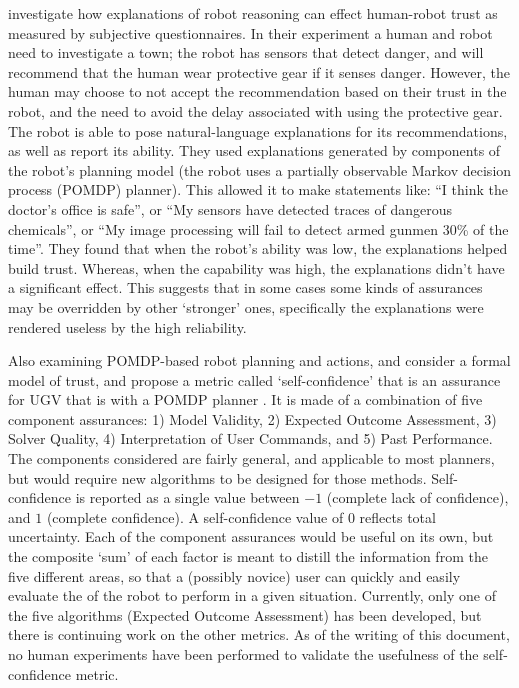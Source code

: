   \citet{Wang2016-id} investigate how explanations of robot reasoning can effect human-robot trust as measured by subjective questionnaires. In their experiment a human and robot need to investigate a town; the robot has sensors that detect danger, and will recommend that the human wear protective gear if it senses danger. However, the human may choose to not accept the recommendation based on their trust in the robot, and the need to avoid the delay associated with using the protective gear. The robot is able to pose natural-language explanations for its recommendations, as well as report its ability. They used explanations generated by components of the robot's planning model (the robot uses a partially observable Markov decision process (POMDP) planner). This allowed it to make statements like: ``I think the doctor's office is safe'', or ``My sensors have detected traces of dangerous chemicals'', or ``My image processing will fail to detect armed gunmen 30\% of the time''. They found that when the robot's ability was low, the explanations helped build trust. Whereas, when the capability was high, the explanations didn't have a significant effect. This suggests that in some cases some kinds of assurances may be overridden by other `stronger' ones, specifically the explanations were rendered useless by the high reliability. 

Also examining POMDP-based robot planning and actions, \citet{Aitken2016-fb} and \citet{Aitken2016-cv} consider a formal model of trust, and propose a metric called `self-confidence' that is an assurance for UGV that is with a  POMDP planner . It is made of a combination of five component assurances: 1) Model Validity, 2) Expected Outcome Assessment, 3) Solver Quality, 4) Interpretation of User Commands, and 5) Past Performance. The components considered are fairly general, and applicable to most planners, but would require new algorithms to be designed for those methods.   
Self-confidence is reported as a single value between $-1$ (complete lack of confidence), and $1$ (complete confidence). A self-confidence value of $0$ reflects total uncertainty. Each of the component assurances would be useful on its own, but the composite `sum' of each factor is meant to distill the information from the five different areas, so that a (possibly novice) user can quickly and easily evaluate the  of the robot to perform in a given situation. Currently, only one of the five algorithms (Expected Outcome Assessment) has been developed, but there is continuing work on the other metrics. As of the writing of this document, no human experiments have been performed to validate the usefulness of the self-confidence metric. 


